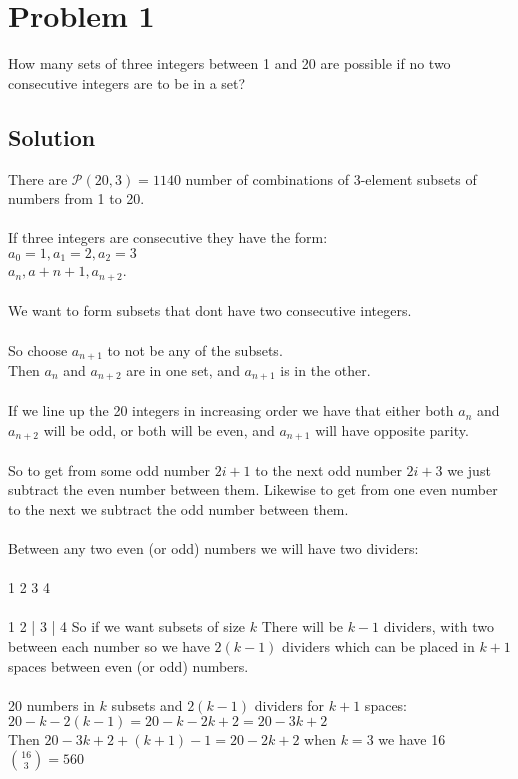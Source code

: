 \documentclass{article}
\begin{document}
 
\section*{Problem 1}
 How many sets of three integers between 1 and 20 are possible if no two consecutive integers are to be in a set?
  \bigskip
  
  \subsection*{Solution}
      There are $\mathcal{P}(20,3) = 1140$ number of combinations of 3-element subsets of numbers from 1 to 20. 
      \\ \\
      If three integers are consecutive they have the form: \\
      $a_{0}=1,a_{1}=2,a_{2}=3$ \\
      $a_{n},a+{n+1},a_{n+2}$. 
      \\ \\
      We want to form subsets that dont have two consecutive integers.
      \\ \\ 
      So choose $a_{n+1}$ to not be any of the subsets. \\
      Then $a_{n}$ and $a_{n+2}$ are in one set, and $a_{n+1}$ is in the other. 
      \\ \\
      If we line up the 20 integers in increasing order we have that either both $a_{n}$ and $a_{n+2}$ will be odd, or both will be even, and $a_{n+1}$ will have opposite parity. 
      \\ \\
      So to get from some odd number $2i+1$ to the next odd number $2i+3$ we just subtract the even number between them. Likewise to get from one even number to the next we subtract the odd number between them. 
      \\ \\
      Between any two even (or odd) numbers we will have two dividers:
      \\ \\
      1  2  3  4
      \\ \\
      1  2 | 3 | 4 
      So if we want subsets of size $k$ There will be $k-1$ dividers, with two between each number so we have $2(k-1)$ dividers which can be placed in $k+1$ spaces between even (or odd) numbers. 
      \\ \\
      20 numbers in $k$ subsets and $2(k-1)$ dividers for $k+1$ spaces:
      $20-k-2(k-1) = 20 - k -2k+2 = 20 - 3k + 2$
      \\ 
      Then $20-3k+2 + (k+1) - 1 = 20-2k+2$ when $k=3$ we have 16 $\binom{16}{3} = 560$
  
\end{document}

